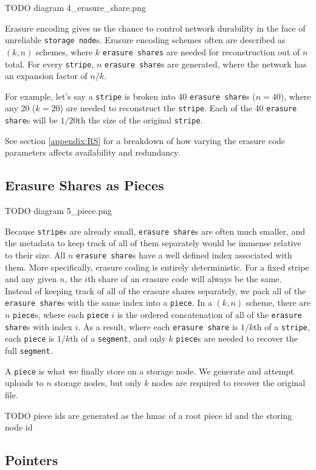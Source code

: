 \documentclass[11pt,fleqn,openany]{book}
\newcommand{\x}[1]{{\tt #1}} \newcommand{\code}[1]{{\em #1}}
\newcommand{\todo}[1]{{\color{red} TODO #1 }}
\begin{document}
\todo{diagram 4\_erasure\_share.png}

Erasure encoding gives us the chance to control network durability in the face
of unreliable \x{storage node}s. Erasure encoding schemes often are
described as $(k, n)$ schemes, where $k$ \x{erasure shares} are needed for
reconstruction out of $n$ total. For every \x{stripe}, $n$ \x{erasure share}s
are generated, where the network has an expansion factor of $n/k$.

For example, let's say a \x{stripe} is broken into 40 \x{erasure share}s
($n=40$), where any 20 ($k=20$) are needed to reconstruct the \x{stripe}. Each
of the 40 \x{erasure share}s will be $1/20$th the size of the original
\x{stripe}.


See section \ref{appendix:RS} for a breakdown of how varying the erasure code
parameters affects availability and redundancy.

\subsection{Erasure Shares as Pieces}

\todo{diagram 5\_piece.png}

Because \x{stripe}s are already small, \x{erasure share}s are often much
smaller, and the metadata to keep track of all of them separately would be
immense relative to their size.
All $n$ \x{erasure share}s have a well defined index associated
with them. More specifically, erasure coding is entirely deterministic. For
a fixed stripe and any given $n$, the $i$th share of an erasure
code will always be the same.
Instead of keeping track of all of the
erasure shares separately, we pack all of the \x{erasure share}s with the
same index into a \x{piece}.
In a $(k, n)$ scheme, there are $n$ \x{piece}s, where each
\x{piece} $i$ is the ordered concatenation of all of the \x{erasure share}s with
index $i$. As a result, where each \x{erasure share} is $1/k$th of a
\x{stripe}, each \x{piece} is $1/k$th of a \x{segment}, and only $k$
\x{piece}s are needed to recover the full \x{segment}.

A \x{piece} is what
we finally store on a storage node. We generate and attempt uploads to $n$
storage nodes, but only $k$ nodes are required to recover the original file.

\todo{piece ids are generated as the hmac of a root piece id and the storing
node id}

\subsection{Pointers}
\end{document}
